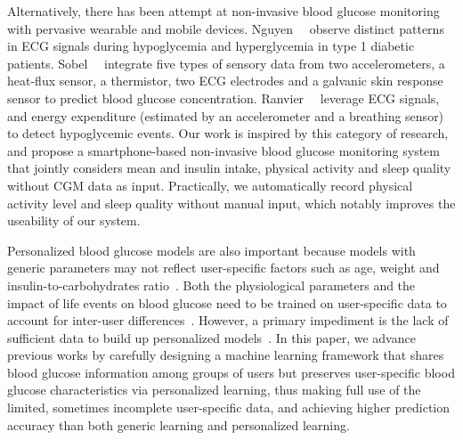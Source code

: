 Alternatively, there has been attempt at non-invasive blood glucose monitoring with pervasive wearable and mobile devices.
Nguyen~\etal~\cite{bib:EMBC12:Nguyen} observe distinct patterns in ECG signals during hypoglycemia and hyperglycemia in type 1 diabetic patients.
Sobel~\etal~\cite{bib:JDST14:Sobel} integrate five types of sensory data from two accelerometers, a heat-flux sensor, a thermistor, two ECG electrodes and a galvanic skin response sensor to predict blood glucose concentration.
Ranvier~\etal~\cite{bib:SEMPER16:Ranvier} leverage ECG signals, and energy expenditure (estimated by an accelerometer and a breathing sensor) to detect hypoglycemic events.
Our work is inspired by this category of research, and propose a smartphone-based non-invasive blood glucose monitoring system that jointly considers mean and insulin intake, physical activity and sleep quality without CGM data as input.
Practically, we automatically record physical activity level and sleep quality without manual input, which notably improves the useability of our system.


Personalized blood glucose models are also important because models with generic parameters may not reflect user-specific factors such as age, weight and insulin-to-carbohydrates ratio~\cite{bib:IJNMBE16:Oviedo}.
Both the physiological parameters and the impact of life events on blood glucose need to be trained on user-specific data to account for inter-user differences~\cite{bib:ICMLA13:Bunescu}.
However, a primary impediment is the lack of sufficient data to build up personalized models~\cite{bib:KDHealth16:Marling}.
In this paper, we advance previous works by carefully designing a machine learning framework that shares blood glucose information among groups of users but preserves user-specific blood glucose characteristics via personalized learning, thus making full use of the limited, sometimes incomplete user-specific data, and achieving higher prediction accuracy than both generic learning and personalized learning.


